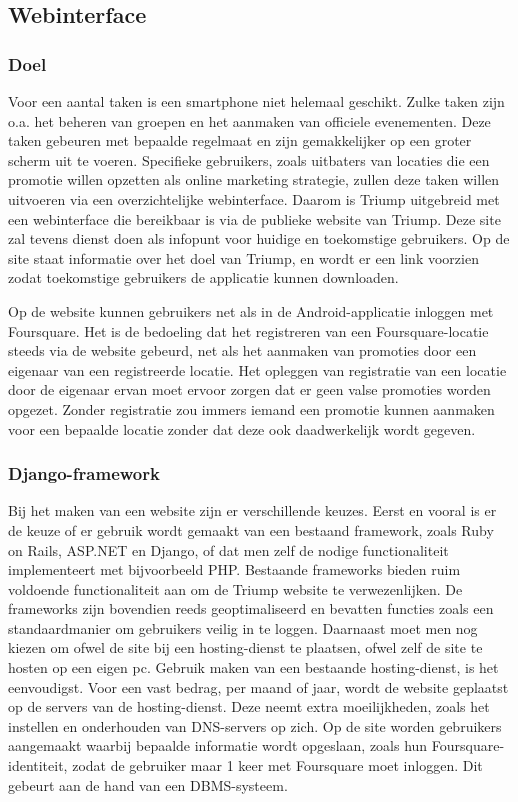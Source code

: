 \subsection{Webinterface}
\label{Webinterface}
\subsubsection{Doel}
Voor een aantal taken is een smartphone niet helemaal geschikt. Zulke taken zijn o.a. het beheren van groepen en het aanmaken van officiele evenementen.
Deze taken gebeuren met bepaalde regelmaat en zijn gemakkelijker op een groter scherm uit te voeren. Specifieke gebruikers, zoals uitbaters van locaties die een promotie willen opzetten als online marketing strategie, zullen deze taken willen uitvoeren via een overzichtelijke webinterface. Daarom is Triump uitgebreid met een webinterface die bereikbaar is via de publieke website van Triump.
Deze site zal tevens dienst doen als infopunt voor huidige en toekomstige gebruikers. Op de site staat informatie over het doel van Triump, en wordt er een link voorzien zodat toekomstige gebruikers de applicatie kunnen downloaden.

Op de website kunnen gebruikers net als in de Android-applicatie inloggen met Foursquare. Het is de bedoeling dat het registreren van een Foursquare-locatie steeds via de website gebeurd, net als het aanmaken van promoties door een eigenaar van een registreerde locatie. Het opleggen van registratie van een locatie door de eigenaar ervan moet ervoor zorgen dat er geen valse promoties worden opgezet. Zonder registratie zou immers iemand een promotie kunnen aanmaken voor een bepaalde locatie zonder dat deze ook daadwerkelijk wordt gegeven.

\subsubsection{Django-framework}
Bij het maken van een website zijn er verschillende keuzes.
Eerst en vooral is er de keuze of er gebruik wordt gemaakt van een bestaand framework, zoals Ruby on Rails, ASP.NET en Django, of dat men zelf de nodige functionaliteit implementeert met bijvoorbeeld PHP.
Bestaande frameworks bieden ruim voldoende functionaliteit aan om de Triump website te verwezenlijken. De frameworks zijn bovendien reeds geoptimaliseerd en bevatten functies zoals een standaardmanier om gebruikers veilig in te loggen. 
Daarnaast moet men nog kiezen om ofwel de site bij een hosting-dienst te plaatsen, ofwel zelf de site te hosten op een eigen pc. Gebruik maken van een bestaande hosting-dienst, is het eenvoudigst. Voor een vast bedrag, per maand of jaar, wordt de website geplaatst op de servers van de hosting-dienst. Deze neemt extra moeilijkheden, zoals het instellen en onderhouden van DNS-servers op zich.
Op de site worden gebruikers aangemaakt waarbij bepaalde informatie wordt opgeslaan, zoals hun Foursquare-identiteit, zodat de gebruiker maar 1 keer met Foursquare moet inloggen. Dit gebeurt aan de hand van een DBMS-systeem. \\

